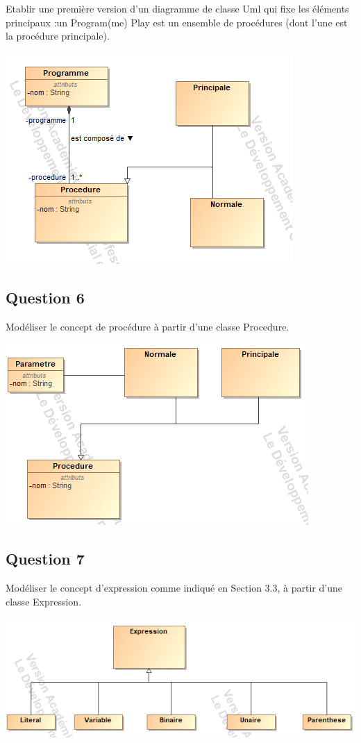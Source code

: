 \documentclass[11pt]{article}
\begin{document}
Etablir une première version d'un diagramme de classe Uml qui fixe les éléments principaux :un Program(me) Play est un ensemble de procédures (dont l'une est la procédure principale).

 \includegraphics[scale=0.5]{Play_Q1.png}

\subsection{Question 6}

Modéliser le concept de procédure à partir d'une classe Procedure.

 \includegraphics[scale=0.5]{Play_Procedure.png}

\subsection{Question 7}

Modéliser le concept d'expression comme indiqué en Section 3.3, à partir d'une classe Expression.

 \includegraphics[scale=0.5]{Play_Expression.png}
\end{document}
